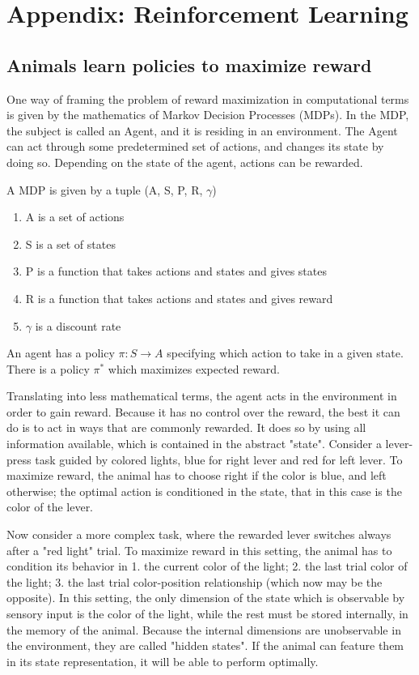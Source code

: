 \chapter*{Appendix: Reinforcement Learning}

\section{Animals learn policies to maximize reward}
    One way of framing the problem of reward maximization in computational terms is given by the mathematics of Markov Decision Processes (MDPs). In the MDP, the subject is called an Agent, and it is residing in an environment. The Agent can act through some predetermined set of actions, and changes its state by doing so. Depending on the state of the agent, actions can be rewarded.
    
    A MDP is given by a tuple (A, S, P, R, $\gamma$)
    \begin{enumerate}
        \item A is a set of actions
        \item S is a set of states
        \item P is a function that takes actions and states and gives states
        \item R is a function that takes actions and states and gives reward
        \item $\gamma$ is a discount rate
    \end{enumerate}
    
    An agent has a policy $\pi : S \rightarrow A $ specifying which action to take in a given state.
    There is a policy $\pi^*$ which maximizes expected reward.
    
    Translating into less mathematical terms, the agent acts in the environment in order to gain reward. Because it has no control over the reward, the best it can do is to act in ways that are commonly rewarded. It does so by using all information available, which is contained in the abstract "state". Consider a lever-press task guided by colored lights, blue for right lever and red for left lever. To maximize reward, the animal has to choose right if the color is blue, and left otherwise; the optimal action is conditioned in the state, that in this case is the color of the lever. 
    
    Now consider a more complex task, where the rewarded lever switches always after a "red light" trial. To maximize reward in this setting, the animal has to condition its behavior in 1. the current color of the light; 2. the last trial color of the light; 3. the last trial color-position relationship (which now may be the opposite). In this setting, the only dimension of the state which is observable by sensory input is the color of the light, while the rest must be stored internally, in the memory of the animal. Because the internal dimensions are unobservable in the environment, they are called "hidden states". If the animal can feature them in its state representation, it will be able to perform optimally.
    
